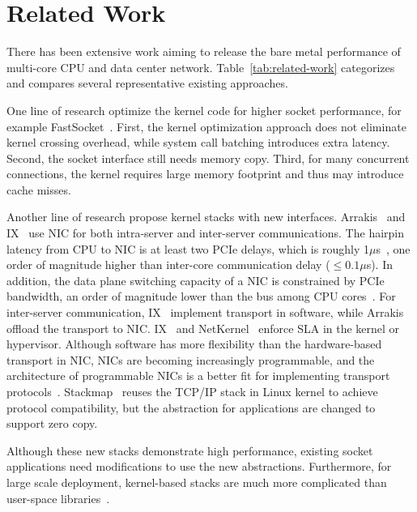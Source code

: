 \section{Related Work}
\label{sec:related}

There has been extensive work aiming to release the bare metal performance of multi-core CPU and data center network. Table~\ref{tab:related-work} categorizes and compares several representative existing approaches.

One line of research optimize the kernel code for higher socket performance, for example FastSocket~\cite{lin2016scalable}.
First, the kernel optimization approach does not eliminate kernel crossing overhead, while system call batching introduces extra latency.
Second, the socket interface still needs memory copy.
Third, for many concurrent connections, the kernel requires large memory footprint and thus may introduce cache misses.


Another line of research propose kernel stacks with new interfaces.
Arrakis~\cite{peter2016arrakis} and IX~\cite{belay2017ix} use NIC for both intra-server and inter-server communications. The hairpin latency from CPU to NIC is at least two PCIe delays, which is roughly 1$\mu$s~\cite{kaminsky2016design}, one order of magnitude higher than inter-core communication delay ($\leq0.1\mu$s). In addition, the data plane switching capacity of a NIC is constrained by PCIe bandwidth, an order of magnitude lower than the bus among CPU cores~\cite{li2017kv}. For inter-server communication, IX~\cite{belay2017ix} implement transport in software, while Arrakis~\cite{peter2016arrakis} offload the transport to NIC. IX~\cite{belay2017ix} and NetKernel~\cite{niu2017network} enforce SLA in the kernel or hypervisor. Although software has more flexibility than the hardware-based transport in NIC, NICs are becoming increasingly programmable, and the architecture of programmable NICs is a better fit for implementing transport protocols~\cite{kaufmann2015flexnic,smartnic,mellanox,cavium}. 
Stackmap~\cite{yasukata2016stackmap} reuses the TCP/IP stack in Linux kernel to achieve protocol compatibility, but the abstraction for applications are changed to support zero copy.

Although these new stacks demonstrate high performance, existing socket applications need modifications to use the new abstractions.
Furthermore, for large scale deployment, kernel-based stacks are much more complicated than user-space libraries~\cite{andromeda}.

